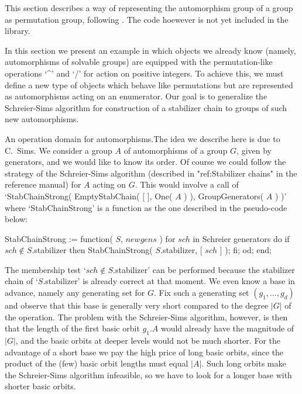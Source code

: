 \endgroup%


This section describes a way of representing the automorphism group of a
group as permutation group, following \cite{Sims97}. The code hoewever is
not yet included in the {\GAP} library.

In this section  we present an example in  which objects we  already know
(namely,  automorphisms  of   solvable  groups)   are  equipped  with the
permutation-like operations `^' and `/'  for action on positive integers.
To achieve this, we must  define a new  type of objects which behave like
permutations   but are  represented     as automorphisms  acting  on   an
enumerator.  Our  goal is to  generalize  the Schreier-Sims algorithm for
construction of a stabilizer chain to groups of such new automorphisms.

{\bsf  An operation domain for automorphisms.}\quad  The idea we describe
here is due  to C.~Sims. We consider  a group $A$  of  automorphisms of a
group $G$, given by generators,  and we would like  to know its order. Of
course we  could   follow the strategy  of  the   Schreier-Sims algorithm
(described  in "ref:Stabilizer chains"  in  the reference manual) for $A$
acting   on   $G$. This would    involve   a  call  of  `StabChainStrong(
EmptyStabChain( [   ],  One( $A$ ) ),   GroupGenerators(  $A$ ) )'  where
`StabChainStrong'  is a function as the  one described in the pseudo-code
below:

\)StabChainStrong := function( $S$, $newgens$ )
\)
\)\quad for $sch$  in {\rm Schreier generators}  do
\)\qquad if $sch \notin S$.stabilizer  then
\)\qquad\quad StabChainStrong( $S$.stabilizer, [ $sch$ ] );
\)\qquad fi;
\)\quad od;
\)end;
  \vadjust{\allowbreak}%

The membership test `$sch  \notin S$.stabilizer' can be performed because
the  stabilizer chain  of `$S$.stabilizer'  is   already correct at  that
moment. We  even know a base  in advance, namely  any  generating set for
$G$. Fix such  a generating set  $(g_1,\ldots,g_d)$ and observe that this
base  is  generally very   short compared  to   the degree $|G|$  of  the
operation. The problem with the Schreier-Sims algorithm, however, is then
that the length of the first  basic orbit $g_1.A$  would already have the
magnitude of $|G|$,  and the basic orbits at  deeper levels would  not be
much shorter. For the advantage of a short base  we pay the high price of
long basic  orbits, since the  product of  the  (few) basic orbit lengths
must  equal $|A|$.  Such  long  orbits  make the Schreier-Sims  algorithm
infeasible,   so we have to   look for a  longer base  with shorter basic
orbits.

